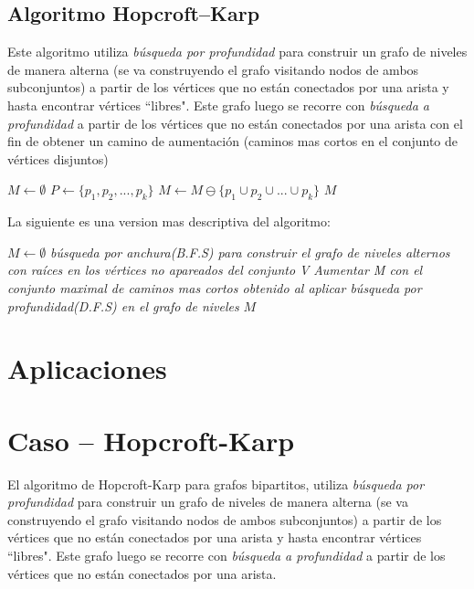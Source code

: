 \documentclass[12pt,a4paper]{article}
\begin{document}
\subsection{Algoritmo Hopcroft–Karp}
Este algoritmo utiliza \textit{búsqueda por profundidad} para construir un grafo de niveles de manera alterna (se va construyendo el grafo visitando nodos de ambos subconjuntos) a partir de los vértices que no están conectados por una arista y hasta encontrar vértices ``libres". Este grafo luego se recorre con \textit{búsqueda a profundidad} a partir de los vértices que no están conectados por una arista con el fin de obtener un camino de aumentación (caminos mas cortos en el conjunto de vértices disjuntos)
\begin{center}
\begin{algorithmic}[1]
\STATE $M\gets \emptyset$
\REPEAT
	\STATE $P\gets \{p_1, p_2, ..., p_k\}$
	\STATE $M\gets M \ominus \{p_1 \cup p_2 \cup ... \cup p_k\}$
\RETURN $M$
\end{algorithmic}
\end{center}
La siguiente es una version mas descriptiva del algoritmo:
\begin{center}
\begin{algorithmic}[1]
\STATE $M\gets \emptyset$
\REPEAT
	\STATE \textit{búsqueda por anchura(B.F.S) para construir el grafo de niveles alternos con raíces en los vértices no apareados del conjunto V}
	\STATE \textit{Aumentar M con el conjunto maximal de caminos mas cortos obtenido al aplicar búsqueda por profundidad(D.F.S) en el grafo de niveles}
\RETURN $M$
\end{algorithmic}
\end{center}




\section{Aplicaciones} \noindent

\section{Caso -- Hopcroft-Karp} \noindent
El algoritmo de Hopcroft-Karp para grafos bipartitos, utiliza \textit{búsqueda por profundidad} para construir un grafo de niveles de manera alterna (se va construyendo el grafo visitando nodos de ambos subconjuntos) a partir de los vértices que no están conectados por una arista y hasta encontrar vértices ``libres". Este grafo luego se recorre con \textit{búsqueda a profundidad} a partir de los vértices que no están conectados por una arista.
\end{document}
